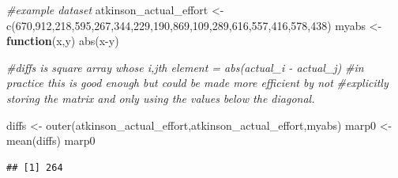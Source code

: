 \documentclass[
]{book}
\newenvironment{Shaded}{\begin{snugshade}}{\end{snugshade}}
\newcommand{\CommentTok}[1]{\textcolor[rgb]{0.56,0.35,0.01}{\textit{#1}}}
\newcommand{\ControlFlowTok}[1]{\textcolor[rgb]{0.13,0.29,0.53}{\textbf{#1}}}
\newcommand{\DecValTok}[1]{\textcolor[rgb]{0.00,0.00,0.81}{#1}}
\newcommand{\FunctionTok}[1]{\textcolor[rgb]{0.00,0.00,0.00}{#1}}
\newcommand{\NormalTok}[1]{#1}
\newcommand{\OtherTok}[1]{\textcolor[rgb]{0.56,0.35,0.01}{#1}}
\newcommand{\SpecialCharTok}[1]{\textcolor[rgb]{0.00,0.00,0.00}{#1}}
\begin{document}
\begin{Shaded}
\begin{Highlighting}[]
\CommentTok{\#example dataset}
\NormalTok{atkinson\_actual\_effort }\OtherTok{\textless{}{-}}
  \FunctionTok{c}\NormalTok{(}\DecValTok{670}\NormalTok{,}\DecValTok{912}\NormalTok{,}\DecValTok{218}\NormalTok{,}\DecValTok{595}\NormalTok{,}\DecValTok{267}\NormalTok{,}\DecValTok{344}\NormalTok{,}\DecValTok{229}\NormalTok{,}\DecValTok{190}\NormalTok{,}\DecValTok{869}\NormalTok{,}\DecValTok{109}\NormalTok{,}\DecValTok{289}\NormalTok{,}\DecValTok{616}\NormalTok{,}\DecValTok{557}\NormalTok{,}\DecValTok{416}\NormalTok{,}\DecValTok{578}\NormalTok{,}\DecValTok{438}\NormalTok{)}
\NormalTok{myabs }\OtherTok{\textless{}{-}} \ControlFlowTok{function}\NormalTok{(x,y) }\FunctionTok{abs}\NormalTok{(x}\SpecialCharTok{{-}}\NormalTok{y)}

\CommentTok{\#diffs is square array whose i,jth element = abs(actual\_i {-} actual\_j)}
\CommentTok{\#in practice this is good enough but could be made more efficient by not}
\CommentTok{\#explicitly storing the matrix and only using the values below the diagonal.}

\NormalTok{diffs }\OtherTok{\textless{}{-}} \FunctionTok{outer}\NormalTok{(atkinson\_actual\_effort,atkinson\_actual\_effort,myabs)}
\NormalTok{marp0 }\OtherTok{\textless{}{-}} \FunctionTok{mean}\NormalTok{(diffs)}
\NormalTok{marp0}
\end{Highlighting}
\end{Shaded}

\begin{verbatim}
## [1] 264
\end{verbatim}
\end{document}
